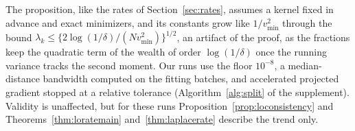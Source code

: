 The proposition, like the rates of Section~\ref{sec:rates}, assumes a kernel fixed in advance and exact minimizers,
and its constants grow like $1/v^2_{\min}$ through the bound $\lambda_k\le\{2\log(1/\delta)/(Nv^2_{\min})\}^{1/2}$, an
artifact of the proof, as the fractions keep the quadratic term of the wealth of order $\log(1/\delta)$ once the
running variance tracks the second moment. Our runs use the floor $10^{-8}$, a median-distance
bandwidth computed on the fitting batches, and accelerated projected gradient stopped at a relative tolerance
(Algorithm~\ref{alg:split} of the supplement). Validity is unaffected, but for these runs Proposition~\ref{prop:loconsistency} and
Theorems~\ref{thm:loratemain} and~\ref{thm:laplacerate} describe the trend only.
